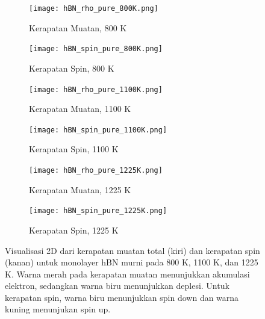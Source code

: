 \begin{figure}[htbp!]
  \centering
  \begin{subfigure}[b]{0.49\textwidth}
    \centering
    \texttt{[image: hBN\_rho\_pure\_800K.png]}
    \caption{Kerapatan Muatan, 800 K}
    \label{subfig:rho_pure_800k}
  \end{subfigure}\hfill
  \begin{subfigure}[b]{0.49\textwidth}
    \centering
    \texttt{[image: hBN\_spin\_pure\_800K.png]}
    \caption{Kerapatan Spin, 800 K}
    \label{subfig:spin_pure_800k}
  \end{subfigure}
  \vspace{1em}

  \begin{subfigure}[b]{0.49\textwidth}
    \centering
    \texttt{[image: hBN\_rho\_pure\_1100K.png]}
    \caption{Kerapatan Muatan, 1100 K}
    \label{subfig:rho_pure_1100k}
  \end{subfigure}\hfill
  \begin{subfigure}[b]{0.49\textwidth}
    \centering
    \texttt{[image: hBN\_spin\_pure\_1100K.png]}
    \caption{Kerapatan Spin, 1100 K}
    \label{subfig:spin_pure_1100k}
  \end{subfigure}
  \vspace{1em}

  \begin{subfigure}[b]{0.49\textwidth}
    \centering
    \texttt{[image: hBN\_rho\_pure\_1225K.png]}
    \caption{Kerapatan Muatan, 1225 K}
    \label{subfig:rho_pure_1225k}
  \end{subfigure}\hfill
  \begin{subfigure}[b]{0.49\textwidth}
    \centering
    \texttt{[image: hBN\_spin\_pure\_1225K.png]}
    \caption{Kerapatan Spin, 1225 K}
    \label{subfig:spin_pure_1225k}
  \end{subfigure}

  \caption{Visualisasi 2D dari kerapatan muatan total (kiri) dan kerapatan spin (kanan) untuk monolayer hBN murni pada 800 K, 1100 K, dan 1225 K. Warna merah pada kerapatan muatan menunjukkan akumulasi elektron, sedangkan warna biru menunjukkan deplesi. Untuk kerapatan spin, warna biru menunjukkan spin down dan warna kuning menunjukan spin up.}
  \label{fig:hbn_pure_density}
\end{figure}

